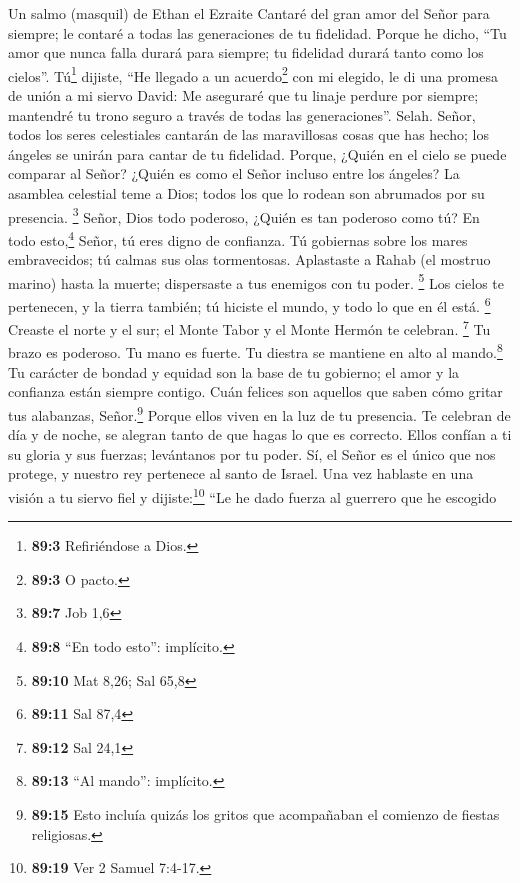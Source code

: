 Un salmo (masquil) de Ethan el Ezraite  Cantaré del gran
amor del Señor para siempre; le contaré a todas las generaciones de tu
fidelidad.  Porque he dicho, ``Tu amor que nunca falla
durará para siempre; tu fidelidad durará tanto como los cielos''.
 Tú\footnote{\textbf{89:3} Refiriéndose a Dios.} dijiste,
``He llegado a un acuerdo\footnote{\textbf{89:3} O pacto.} con mi
elegido, le di una promesa de unión a mi siervo David:  Me
aseguraré que tu linaje perdure por siempre; mantendré tu trono seguro a
través de todas las generaciones''. Selah.  Señor, todos
los seres celestiales cantarán de las maravillosas cosas que has hecho;
los ángeles se unirán para cantar de tu fidelidad. 
Porque, ¿Quién en el cielo se puede comparar al Señor? ¿Quién es como el
Señor incluso entre los ángeles?  La asamblea celestial
teme a Dios; todos los que lo rodean son abrumados por su presencia.
\footnote{\textbf{89:7} Job 1,6}  Señor, Dios todo
poderoso, ¿Quién es tan poderoso como tú? En todo esto,\footnote{\textbf{89:8}
  ``En todo esto'': implícito.} Señor, tú eres digno de confianza.
 Tú gobiernas sobre los mares embravecidos; tú calmas sus
olas tormentosas.  Aplastaste a Rahab (el mostruo marino)
hasta la muerte; dispersaste a tus enemigos con tu poder. \footnote{\textbf{89:10}
  Mat 8,26; Sal 65,8}  Los cielos te pertenecen, y la
tierra también; tú hiciste el mundo, y todo lo que en él está.
\footnote{\textbf{89:11} Sal 87,4}  Creaste el norte y el
sur; el Monte Tabor y el Monte Hermón te celebran. \footnote{\textbf{89:12}
  Sal 24,1}  Tu brazo es poderoso. Tu mano es fuerte. Tu
diestra se mantiene en alto al mando.\footnote{\textbf{89:13} ``Al
  mando'': implícito.}  Tu carácter de bondad y equidad
son la base de tu gobierno; el amor y la confianza están siempre
contigo.  Cuán felices son aquellos que saben cómo gritar
tus alabanzas, Señor.\footnote{\textbf{89:15} Esto incluía quizás los
  gritos que acompañaban el comienzo de fiestas religiosas.} Porque
ellos viven en la luz de tu presencia.  Te celebran de
día y de noche, se alegran tanto de que hagas lo que es correcto.
 Ellos confían a ti su gloria y sus fuerzas; levántanos
por tu poder.  Sí, el Señor es el único que nos protege,
y nuestro rey pertenece al santo de Israel.  Una vez
hablaste en una visión a tu siervo fiel y dijiste:\footnote{\textbf{89:19}
  Ver 2 Samuel 7:4-17.} ``Le he dado fuerza al guerrero que he escogido
